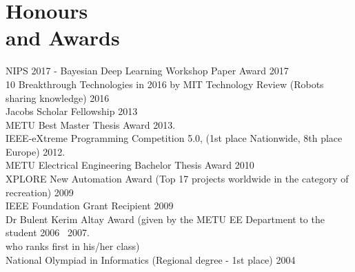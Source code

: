 
\section{\mysidestyle \textcolor{olgray}{Honours \\and Awards}}
NIPS 2017 - Bayesian Deep Learning Workshop Paper Award \hfill 2017 \vspace{1mm}\\
10 Breakthrough Technologies in 2016 by MIT Technology Review (Robots sharing knowledge) \hfill 2016 \vspace{1mm}\\
Jacobs Scholar Fellowship \hfill 2013 \vspace{1mm}\\
METU Best Master Thesis Award \hfill  2013{\color{white}.}\vspace{1mm}\\
IEEE-eXtreme Programming Competition 5.0,  (1st place Nationwide, 8th place Europe) \hfill 2012{\color{white}.}\vspace{1mm}\\
METU Electrical Engineering Bachelor Thesis Award  \hfill 2010 \vspace{1mm}\vspace{1mm}\\
XPLORE New Automation Award (Top 17 projects worldwide in the category of recreation)  \hfill 2009 \vspace{1mm}\vspace{1mm}\\
IEEE Foundation Grant Recipient \hfill 2009 \vspace{1mm}\vspace{1mm}\\
Dr Bulent Kerim Altay Award  (given by the METU EE Department to the student \hfill 2006 \textendash ~2007{\color{white}.}\\ who ranks first in his/her class) \vspace{1mm}\vspace{1mm}\\
National Olympiad in Informatics (Regional degree - 1st place) \hfill 2004 \vspace{1mm}\vspace{1mm}\\
\vspace{-4mm}

